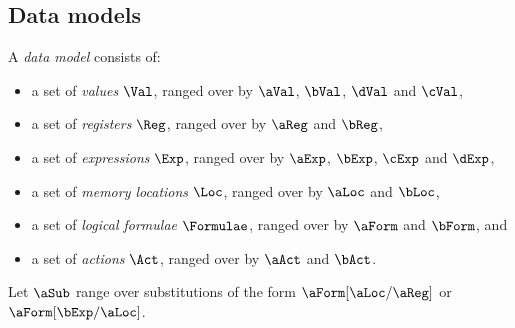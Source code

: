 




\subsection{Data models}
\label{sec:data}

A \emph{data model} consists of:
\begin{itemize}
\item a set of \emph{values} $\Val$, ranged over by
  $\aVal$, $\bVal$, $\dVal$ and $\cVal$,
\item a set of \emph{registers} $\Reg$, ranged over by
  $\aReg$ and $\bReg$,
\item a set of \emph{expressions} $\Exp$, ranged over by
  $\aExp$, $\bExp$, $\cExp$ and $\dExp$,
\item a set of \emph{memory locations} $\Loc$, ranged over by $\aLoc$ and
  $\bLoc$, 
\item a set of \emph{logical formulae} $\Formulae$, ranged over by
  $\aForm$ and $\bForm$, and
\item a set of \emph{actions} $\Act$, ranged over by $\aAct$ and $\bAct$.
\end{itemize}

Let $\aSub$ range over substitutions of the form
$\aForm[\aLoc/\aReg]$ or $\aForm[\bExp/\aLoc]$.


